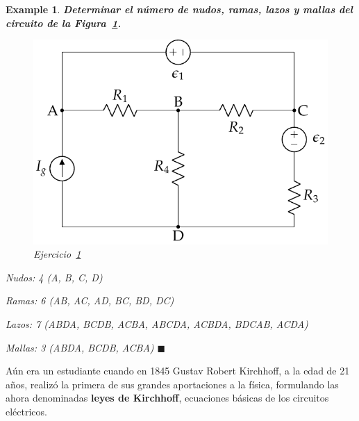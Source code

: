 \documentclass[11pt]{book} %
\numberwithin{dummy}{section}
\theoremstyle{ocrenumbox}
\theoremstyle{blacknumex}
\newtheorem{exampleT}{Example}[chapter]
\theoremstyle{blacknumbox}
\theoremstyle{ocrenum}
\newenvironment{example}{\begin{exampleT}}{\hfill{\tiny\ensuremath{\blacksquare}}\end{exampleT}}
\begin{document}
	\vspace{4mm}
	\begin{example}\label{ej.1-3}
		\textbf{Determinar el número de nudos, ramas, lazos y mallas del circuito de la Figura~\ref{fig.mallas}.}
		\begin{figure}[htbp]
			\centering
			\includegraphics[width=0.4\linewidth]{../figs/mallas.pdf}
			\caption{Ejercicio~\ref{ej.1-3}}
			\label{fig.mallas}
		\end{figure}
		
		Nudos: 4 (A, B, C, D)
		
		Ramas: 6 (AB, AC, AD, BC, BD, DC)
		
		Lazos: 7 (ABDA, BCDB, ACBA, ABCDA, ACBDA, BDCAB, ACDA) 
		
		Mallas: 3 (ABDA, BCDB, ACBA)
	\end{example}
	
	
	Aún era un estudiante cuando en 1845 Gustav Robert Kirchhoff, a la edad de 21 años, realizó la primera de sus grandes aportaciones a la física, formulando las ahora denominadas \textbf{leyes de Kirchhoff}, ecuaciones básicas de los circuitos eléctricos.
	
\end{document}
